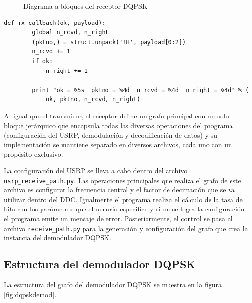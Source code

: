 \begin{figure}[htp]
  \centering
  \vspace{0.3in}
  \caption{Diagrama a bloques del receptor DQPSK}
  \label{fig:grdqpskrx}
\end{figure}

\begin{lstlisting}[float, label=ex:callback, caption={Funci\'on auxiliar que recibe los paquetes decodificados},
breaklines=true]
    def rx_callback(ok, payload):
        global n_rcvd, n_right
        (pktno,) = struct.unpack('!H', payload[0:2])
        n_rcvd += 1
        if ok:
            n_right += 1

        print "ok = %5s  pktno = %4d  n_rcvd = %4d  n_right = %4d" % (
            ok, pktno, n_rcvd, n_right)
\end{lstlisting}

Al igual que el transmisor, el receptor define un grafo principal con un solo bloque jer\'arquico que encapsula todas las
diversas operaciones del programa (configuraci\'on del USRP, demodulaci\'on y decodificaci\'on de datos) y su
implementaci\'on se mantiene separado en diversos archivos, cada uno con un prop\'osito exclusivo.

La configuraci\'on del USRP se lleva a cabo dentro del archivo \\ \verb|usrp_receive_path.py|. Las operaciones principales
que realiza el grafo de este archivo es configurar la frecuencia central y el factor de decimaci\'on que se va utilizar dentro
del DDC. Igualmente el programa realiza el c\'alculo de la tasa de bits con los par\'ametros que el usuario especifico y si
no se logra la configuraci\'on el programa emite un mensaje de error. Posteriormente, el control se pasa al archivo
\verb|receive_path.py| para la generaci\'on y configuraci\'on del grafo que crea la instancia del demodulador DQPSK.

\subsection{Estructura del demodulador DQPSK}
La estructura del grafo del demodulador DQPSK se muestra en la figura \ref{fig:dqpskdemod}.

